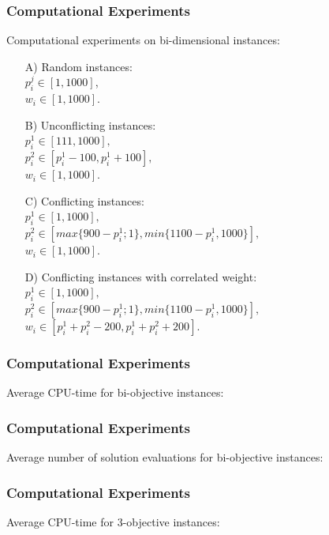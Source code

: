 %
\begin{frame}
\frametitle{Computational Experiments}
Computational experiments on bi-dimensional instances:
\begin{enumerate}
  \item[A)]{ Random instances:\\
    $p^j_i \in [1, 1000]$,\\
    $w_i \in [1,1000]$.} \medskip
  \item[B)]{ Unconflicting instances: \\
    $p^1_i \in [111, 1000],$ \\
    $p^2_i \in [p^1_i - 100, p^1_i + 100],$ \\
    $w_i \in [1,1000]$.} \medskip
  \item[C)]{ Conflicting instances: \\
    $p^1_i \in [1, 1000],$ \\
    $p^2_i \in [max\{900-p^1_i;1\}, min\{1100-p^1_i, 1000\}],$ \\
    $w_i \in [1,1000]$.} \medskip
  \item[D)]{ Conflicting instances with correlated weight: \\
    $p^1_i \in [1, 1000],$ \\
    $p^2_i \in [max\{900-p^1_i;1\}, min\{1100-p^1_i, 1000\}],$ \\
    $w_i \in [p^1_i+p^2_i-200, p^1_i+p^2_i+200]$.}
\end{enumerate}
\end{frame}

%
\begin{frame}
\frametitle{Computational Experiments}
Average CPU-time for bi-objective instances:
\begin{table}[]
  \renewcommand*{\arraystretch}{0.9}
  \centering
  
\end{table}
\end{frame}


%
\begin{frame}
\frametitle{Computational Experiments}
Average number of solution evaluations for bi-objective instances:
\begin{figure}
  
\end{figure}
\end{frame}

%
\begin{frame}
\frametitle{Computational Experiments}
Average CPU-time for 3-objective instances:
\begin{table}[]
  \renewcommand*{\arraystretch}{0.9}
  \centering
  
\end{table}
\end{frame}


